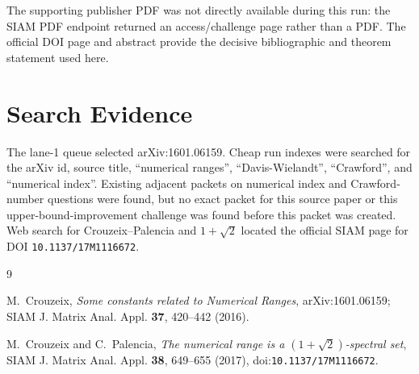 \documentclass[11pt]{article}
\begin{document}
The supporting publisher PDF was not directly available during this run: the
SIAM PDF endpoint returned an access/challenge page rather than a PDF.  The
official DOI page and abstract provide the decisive bibliographic and theorem
statement used here.

\section*{Search Evidence}

The lane-1 queue selected arXiv:1601.06159.  Cheap run indexes were searched
for the arXiv id, source title, ``numerical ranges'', ``Davis-Wielandt'',
``Crawford'', and ``numerical index''.  Existing adjacent packets on numerical
index and Crawford-number questions were found, but no exact packet for this
source paper or this upper-bound-improvement challenge was found before this
packet was created.  Web search for Crouzeix--Palencia and \(1+\sqrt 2\)
located the official SIAM page for DOI \texttt{10.1137/17M1116672}.

{\raggedright
\begin{thebibliography}{9}

M.~Crouzeix,
\emph{Some constants related to Numerical Ranges},
arXiv:1601.06159; SIAM J. Matrix Anal. Appl. \textbf{37}, 420--442 (2016).

M.~Crouzeix and C.~Palencia,
\emph{The numerical range is a \((1+\sqrt 2)\)-spectral set},
SIAM J. Matrix Anal. Appl. \textbf{38}, 649--655 (2017),
doi:\texttt{10.1137/17M1116672}.

\end{thebibliography}
}
\end{document}
